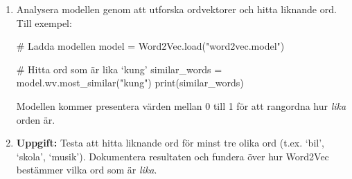 \documentclass[a4paper, 12pt]{article}
\begin{document}
\begin{enumerate}
    \item Analysera modellen genom att utforska ordvektorer och hitta liknande ord. Till exempel:
    \begin{codebox}
# Ladda modellen
model = Word2Vec.load("word2vec.model")

# Hitta ord som är lika ‘kung’
similar_words = model.wv.most_similar("kung")
print(similar_words)
    \end{codebox}

    Modellen kommer presentera värden mellan 0 till 1 för att rangordna hur \textit{lika} orden är.
    
    \item \textbf{Uppgift:} Testa att hitta liknande ord för minst tre olika ord (t.ex. ‘bil’, ‘skola’, ‘musik’). Dokumentera resultaten och fundera över hur Word2Vec bestämmer vilka ord som är \textit{lika}.
\end{enumerate}

\break
\end{document}
